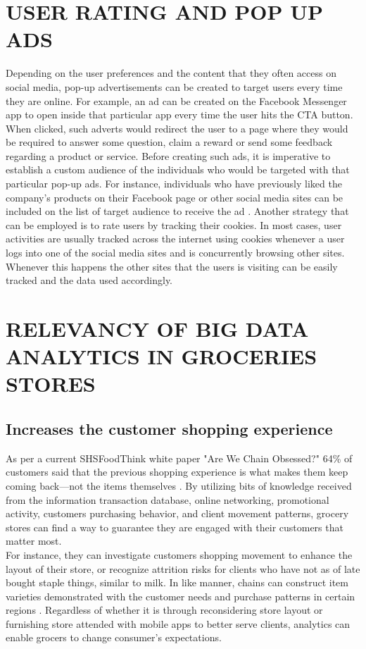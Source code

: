 \documentclass[sigconf]{acmart}
\begin{document}
\section{USER RATING AND POP UP ADS}
Depending on the user preferences and the content that they often access on social media, pop-up advertisements can be created to target users every time they are online. For example, an ad can be created on the Facebook Messenger app to open inside that particular app every time the user hits the CTA button. When clicked, such adverts would redirect the user to a page where they would be required to answer some question, claim a reward or send some feedback regarding a product or service. Before creating such ads, it is imperative to establish a custom audience of the individuals who would be targeted with that particular pop-up ads. For instance, individuals who have previously liked the company’s products on their Facebook page or other social media sites can be included on the list of target audience to receive the ad \cite{Aycock2010}. Another strategy that can be employed is to rate users by tracking their cookies. In most cases, user activities are usually tracked across the internet using cookies whenever a user logs into one of the social media sites and is concurrently browsing other sites. Whenever this happens the other sites that the users is visiting can be easily tracked and the data used accordingly.

\section{RELEVANCY OF BIG DATA ANALYTICS IN GROCERIES STORES}

\subsection{Increases the customer shopping experience }
As per a current SHSFoodThink white paper "Are We Chain Obsessed?" 64{\%} of customers said that the previous shopping experience is what makes them keep coming back—not the items themselves \cite{12}. By utilizing bits of knowledge received from the information transaction database, online networking, promotional activity, customers purchasing behavior, and client movement patterns, grocery stores can find a way to guarantee they are engaged with their customers that matter most.  
\\
	 For instance, they can investigate customers shopping movement to enhance the layout of their store, or recognize attrition risks for clients who have not as of late bought staple things, similar to milk. In like manner, chains can construct item varieties demonstrated with the customer needs and purchase patterns in certain regions \cite{10, 12, 14}. Regardless of whether it is through reconsidering store layout or furnishing store attended with mobile apps to better serve clients, analytics can enable grocers to change consumer’s expectations. 
\end{document}
